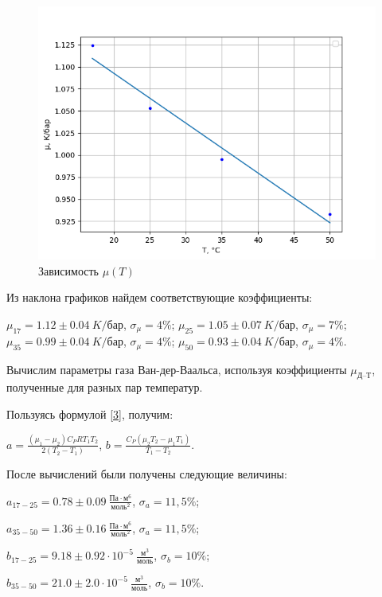 \documentclass[a4paper,12pt]{article} %
\begin{document}
\begin{figure}[H]
    \centering
    \includegraphics[scale=0.95]{mt.png}
    \caption{Зависимость $\mu(T)$}
    \label{DTDP}
\end{figure}


Из наклона графиков найдем соответствующие коэффициенты:

\begin{center}
    $\displaystyle \mu_{17} = 1.12 \pm 0.04\  K/$бар, $\displaystyle \sigma_{\mu} = 4\%$;\break
    $\displaystyle \mu_{25} = 1.05 \pm 0.07\  K/$бар, $\displaystyle \sigma_{\mu} = 7\%$;\break
    $\displaystyle \mu_{35} = 0.99 \pm 0.04\  K/$бар, $\displaystyle \sigma_{\mu} = 4\%$;\break
    $\displaystyle \mu_{50} = 0.93 \pm 0.04\  K/$бар, $\displaystyle \sigma_{\mu} = 4\%$.\break
\end{center}

Вычислим параметры газа Ван-дер-Ваальса, используя коэффициенты $ \mu_\text{Д--Т} $, полученные для разных пар температур.

Пользуясь формулой \eqref{3}, получим:
\begin{center}
    $\displaystyle a = \frac{\left(\mu_1 - \mu_2\right)C_PRT_1T_2}{2\left(T_2-T_1\right)}$,\break\break
	$\displaystyle b = \frac{C_P(\mu_2T_2-\mu_1T_1)}{T_1-T_2}. $

\end{center}

После вычислений были получены следующие величины:

\begin{center}
    $\displaystyle a_{17-25}= 0.78 \pm 0.09 \  \frac{\text{Па}\cdot \text{м}^6}{\text{моль}^2}$, $\displaystyle \sigma_{a} = 11,5 \%$; \break
    
    $\displaystyle a_{35-50}= 1.36 \pm 0.16 \  \frac{\text{Па}\cdot \text{м}^6}{\text{моль}^2}$, $\displaystyle \sigma_{a} = 11,5 \%$; \break

    $\displaystyle b_{17-25}= 9.18 \pm 0.92 \cdot 10^{-5} \ \frac{\text{м}^3}{\text{моль}}$, $\displaystyle \sigma_{b} = 10 \%$; \break
    
    $\displaystyle b_{35-50}= 21.0 \pm 2.0 \cdot 10^{-5} \ \frac{\text{м}^3}{\text{моль}}$, $\displaystyle \sigma_{b} = 10 \%$. \break
\end{center}
\end{document}
